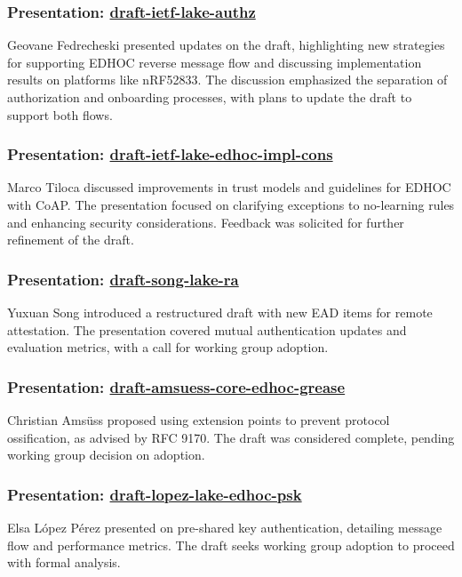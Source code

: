 \documentclass{article}
\begin{document}
\subsubsection{Presentation: \href{https://datatracker.ietf.org/doc/html/draft-ietf-lake-authz}{draft-ietf-lake-authz}}
Geovane Fedrecheski presented updates on the draft, highlighting new strategies for supporting EDHOC reverse message flow and discussing implementation results on platforms like nRF52833. The discussion emphasized the separation of authorization and onboarding processes, with plans to update the draft to support both flows.

\subsubsection{Presentation: \href{https://datatracker.ietf.org/doc/html/draft-ietf-lake-edhoc-impl-cons}{draft-ietf-lake-edhoc-impl-cons}}
Marco Tiloca discussed improvements in trust models and guidelines for EDHOC with CoAP. The presentation focused on clarifying exceptions to no-learning rules and enhancing security considerations. Feedback was solicited for further refinement of the draft.

\subsubsection{Presentation: \href{https://datatracker.ietf.org/doc/html/draft-song-lake-ra}{draft-song-lake-ra}}
Yuxuan Song introduced a restructured draft with new EAD items for remote attestation. The presentation covered mutual authentication updates and evaluation metrics, with a call for working group adoption.

\subsubsection{Presentation: \href{https://datatracker.ietf.org/doc/html/draft-amsuess-core-edhoc-grease}{draft-amsuess-core-edhoc-grease}}
Christian Amsüss proposed using extension points to prevent protocol ossification, as advised by RFC 9170. The draft was considered complete, pending working group decision on adoption.

\subsubsection{Presentation: \href{https://datatracker.ietf.org/doc/html/draft-lopez-lake-edhoc-psk}{draft-lopez-lake-edhoc-psk}}
Elsa López Pérez presented on pre-shared key authentication, detailing message flow and performance metrics. The draft seeks working group adoption to proceed with formal analysis.
\end{document}
